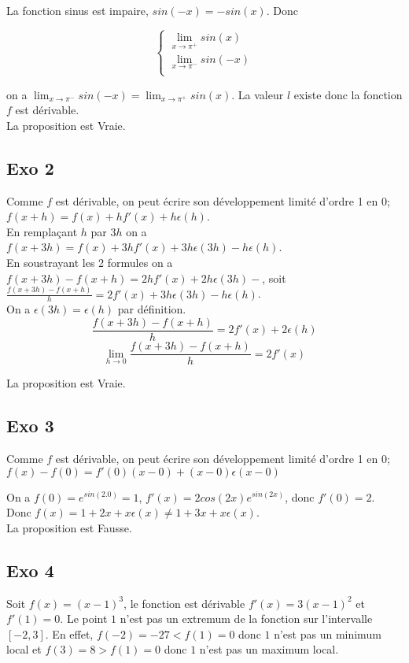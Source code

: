 \documentclass[]{book}
\theoremstyle{definition}
\begin{document}
La fonction sinus est impaire, $sin(-x) = -sin(x)$. Donc

$$ 
\left\{ 
\begin{array}{l}
 \lim_{x \to \pi^{+}} sin(x) \\
 \lim_{x \to \pi^{-}} sin(-x) \\
\end{array}
\right. 
$$

on a $\lim_{x \to \pi^{-}} sin(-x) = \lim_{x \to \pi^{+}} sin(x)$. La valeur $l$ existe donc la fonction $f$ est d\'erivable.\\

La proposition est Vraie.

\subsection*{Exo 2}
Comme $f$ est d\'erivable, on peut \'ecrire son d\'eveloppement limit\'e d'ordre 1 en $0$; $f(x+h) = f(x) + hf'(x) + h\epsilon(h)$.\\

En rempla\c{c}ant $h$ par $3h$ on a $f(x+3h) = f(x) + 3hf'(x) + 3h\epsilon(3h) - h\epsilon(h)$.\\
En soustrayant les 2 formules on a $f(x+3h)-f(x+h) = 2hf'(x) + 2h\epsilon(3h)-$, soit $\frac{f(x+3h)-f(x+h)}{h} = 2f'(x) + 3h\epsilon(3h) - h\epsilon(h)$.\\
On a $\epsilon(3h) = \epsilon(h)$ par d\'efinition.
$$\frac{f(x+3h)-f(x+h)}{h} = 2f'(x) + 2\epsilon(h)$$
$$\lim_{h \to 0} \frac{f(x+3h)-f(x+h)}{h} = 2f'(x)$$

La proposition est Vraie.

\subsection*{Exo 3}
Comme $f$ est d\'erivable, on peut \'ecrire son d\'eveloppement limit\'e d'ordre 1 en $0$; $f(x) - f(0) = f'(0)(x - 0) + (x - 0)\epsilon(x - 0)$

On a $f(0) = e^{sin(2.0)} = 1$, $f'(x) = 2cos(2x)e^{sin(2x)}$, donc $f'(0) = 2$. Donc $f(x) = 1 + 2x + x\epsilon(x) \neq 1 + 3x + x\epsilon(x) $.\\

La proposition est Fausse.


\subsection*{Exo 4}
Soit $f(x) = (x-1)^3$, le fonction est d\'erivable $f'(x)=3(x-1)^2$ et $f'(1) = 0$. Le point $1$ n'est pas un extremum de la fonction sur l'intervalle $[-2,3]$. En effet, $f(-2) = -27 < f(1) = 0$ donc $1$ n'est pas un minimum local et $f(3) = 8 > f(1) = 0$ donc $1$ n'est pas un maximum local.\\
\end{document}
